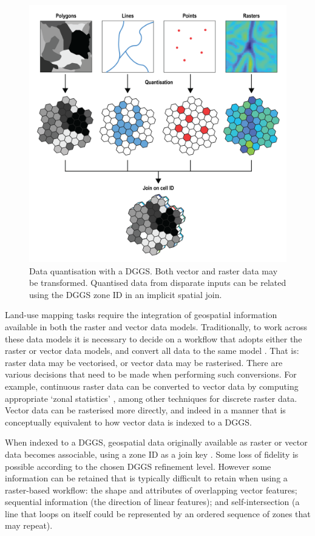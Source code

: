 \documentclass[]{interact}
\theoremstyle{plain}%
\theoremstyle{definition}
\theoremstyle{remark}
\begin{document}
\begin{figure}[t]
    \centering
    \includegraphics[width=0.65\linewidth]{images/DGGS_lu-01.png}
    \caption{Data quantisation with a \ac{DGGS}. Both vector and raster data may be transformed. Quantised data from disparate inputs can be related using the \ac{DGGS} zone ID in an implicit spatial join.}
    \label{fig:Interoperable}
\end{figure}

Land-use mapping tasks require the integration of geospatial information available in both the raster and vector data models. Traditionally, to work across these data models it is necessary to decide on a workflow that adopts either the raster or vector data models, and convert all data to the same model \citep{winter1998bridging,wade2003comparison}. That is: raster data may be vectorised, or vector data may be rasterised. There are various decisions that need to be made when performing such conversions. For example, continuous raster data can be converted to vector data by computing appropriate `zonal statistics' \citep{zhang2015efficient,singla2018distributed}, among other techniques for discrete raster data. Vector data can be rasterised more directly, and indeed in a manner that is conceptually equivalent to how vector data is indexed to a \ac{DGGS}.

When indexed to a \ac{DGGS}, geospatial data originally available as raster or vector data becomes associable, using a zone ID as a join key \citep{dutton1989modelling,sahr2019central}. Some loss of fidelity is possible according to the chosen \ac{DGGS} refinement level. However some information can be retained that is typically difficult to retain when using a raster-based workflow: the shape and attributes of overlapping vector features; sequential information (the direction of linear features); and self-intersection (a line that loops on itself could be represented by an ordered sequence of zones that may repeat).
\end{document}
